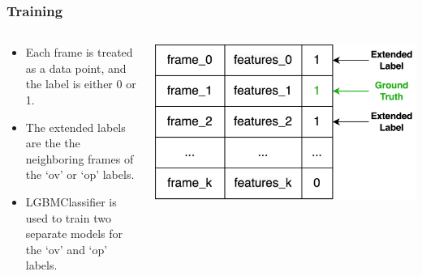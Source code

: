 \documentclass{beamer}
\begin{document}
\begin{frame}[allowframebreaks]
\frametitle{Training}
  \begin{columns}[T] %
    \begin{column}{.5\textwidth}
      \begin{itemize}
        \item Each frame is treated as a data point, and the label is either 0 or 1.
        \item The extended labels are the the neighboring frames of the `ov' or `op' labels.
        \item LGBMClassifier is used to train two separate models for the `ov' and `op' labels.
      \end{itemize}
    \end{column}%
    \begin{column}{.5\textwidth}
      \begin{block}{}
      \includegraphics[width=\textwidth,height=\textheight,keepaspectratio]{img/training.png}
      \end{block}
    \end{column}%
  \end{columns}
\end{frame}
\end{document}
